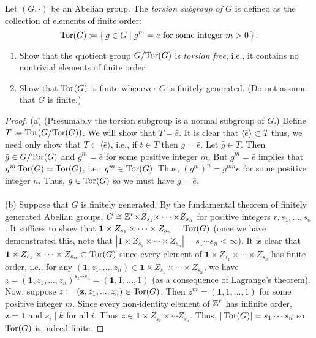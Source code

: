 \begin{problem}
Let $(G,\cdot)$ be an Abelian group. The \emph{torsion subgroup of $G$} is
defined as the collection of elements of finite order:
\[
\operatorname{Tor}(G)\coloneqq
\left\{\,g\in G\;\middle|\;\text{$g^m=e$ for some integer $m>0$}\,\right\}.
\]
\begin{enumerate}[noitemsep,label=(\alph*)]
\item Show that the quotient group $G/{\operatorname{Tor}(G)}$ is \emph{torsion free},
  i.e., it contains no nontrivial elements of finite order.
\item Show that $\operatorname{Tor}(G)$ is finite whenever $G$ is finitely generated. (Do
  not assume that $G$ is finite.)
\end{enumerate}
\end{problem}
\begin{proof}
(a) (Presumably the torsion subgroup is a normal subgroup of $G$.) Define
$T\coloneqq\operatorname{Tor}(G/{\operatorname{Tor}(G)})$. We will show that $T=\bar e$. It is clear
that $\langle\bar e\rangle\subset T$ thus, we need only show that $T\subset
\langle\bar e\rangle$, i.e., if $t\in T$ then $g=\bar e$. Let $\bar g\in
T$. Then $\bar g\in G/{\operatorname{Tor}(G)}$ and $\bar g^m=\bar e$ for some positive
integer $m$. But $\bar g^m=\bar e$ implies that $g^m\operatorname{Tor}(G)=\operatorname{Tor}(G)$, i.e.,
$g^m\in\operatorname{Tor}(G)$. Thus, $(g^m)^n=g^{mn}e$ for some positive integer
$n$. Thus, $g\in\operatorname{Tor}(G)$ so we must have $\bar g=\bar e$.
\\\\
(b) Suppose that $G$ is finitely generated. By the fundamental theorem of
finitely generated Abelian groups, $G\cong\mathbb{Z}^r{\times}
Z_{s_1}{\times}\cdots{\times}Z_{s_n}$ for positive integers
$r,s_1,...,s_n$. It suffices to show that $\mathbf{1}\times
Z_{s_1}\times\cdots\times Z_{s_n}=\operatorname{Tor}(G)$ (once we have demonstrated this,
note that $\left|\mathbf{1}\times Z_{s_1}\times\cdots\times
  Z_{s_n}\right|=s_1\cdots s_n<\infty$). It is clear that $\mathbf{1}\times
Z_{s_1}\times\cdots\times Z_{s_n}\subset\operatorname{Tor}(G)$ since every element of
$\mathbf{1}\times Z_{s_1}\times\cdots\times Z_{s_n}$ has finite order,
i.e., for any $(\mathbf{1},z_1,...,z_n)\in \mathbf{1}\times
Z_{s_1}\times\cdots\times Z_{s_n}$, we have
$z=(\mathbf{1},z_1,...,z_n)^{s_1\cdots s_n}=(\mathbf{1},1,...,1)$ (as a
consequence of Lagrange's theorem). Now, suppose $z\coloneqq
(\mathbf{z},z_1,...,z_n)\in\operatorname{Tor}(G)$. Then $z^m=(\mathbf{1},1,...,1)$ for
some positive integer $m$. Since every non-identity element of $\mathbb{Z}^r$ has
infinite order, $\mathbf{z}=\mathbf{1}$ and $s_i\mid k$ for all $i$. Thus
$z\in\mathbf{1}\times Z_{s_1}\times\cdots Z_{s_n}$. Thus,
$|\operatorname{Tor}(G)|=s_1\cdots s_n$ so $\operatorname{Tor}(G)$ is indeed finite.
\end{proof}

